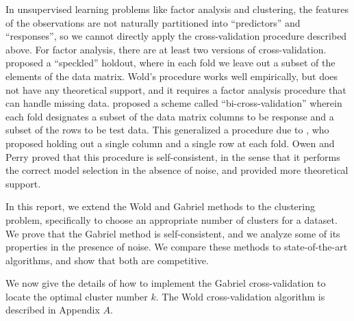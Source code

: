 \documentclass[11pt]{article}
\begin{document}
In unsupervised learning problems like factor analysis and clustering, the
features of the observations are not naturally partitioned into ``predictors''
and ``responses'', so we cannot directly apply the cross-validation procedure
described above.  For factor analysis, there are at least two versions of
cross-validation.  \citet{wold78cross} proposed a ``speckled'' holdout, where
in each fold we leave out a subset of the elements of the data matrix.  Wold's
procedure works well empirically, but does not have any theoretical support,
and it requires a factor analysis procedure that can handle missing data.
\citet{owen2009bi} proposed a scheme called ``bi-cross-validation'' wherein
each fold designates a subset of the data matrix columns to be response and a
subset of the rows to be test data.  This generalized a procedure due to
\citet{gabriel2002biblot}, who proposed holding out a single column and a
single row at each fold.  Owen and Perry proved that this procedure is
self-consistent, in the sense that it performs the correct model selection in
the absence of noise, and \citet{perry2009cross} provided more theoretical
support.


In this report, we extend the Wold and Gabriel methods to the clustering
problem, specifically to choose an appropriate number of clusters for a
dataset.  We prove that the Gabriel method is self-consistent, and we analyze
some of its properties in the presence of noise.  We compare these methods to
state-of-the-art algorithms, and show that both are competitive.







We now give the details of how to implement
the Gabriel cross-validation to locate the optimal cluster number $k$. The
Wold cross-validation algorithm is described in Appendix $A$.
\end{document}
